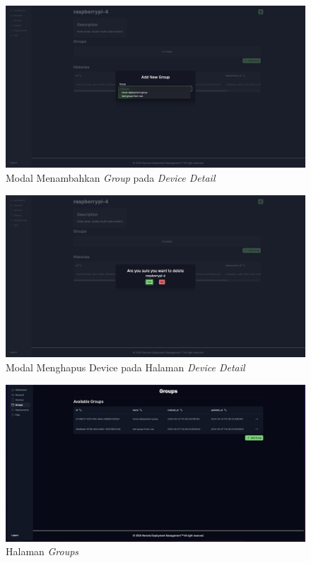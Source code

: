 \begin{figure}[h]
  \centering
  \includegraphics[width=1\textwidth]{resources/chapter-4/dashboard/device-detail-add-group.jpg}
  \caption{Modal Menambahkan \textit{Group} pada \textit{Device Detail}}
  \label{fig:halaman-device-detail-add-group}
\end{figure}

\begin{figure}[h]
  \centering
  \includegraphics[width=1\textwidth]{resources/chapter-4/dashboard/device-detail-delete.jpg}
  \caption{Modal Menghapus Device pada Halaman \textit{Device Detail}}
  \label{fig:halaman-device-detail-delete}
\end{figure}

\begin{figure}[h]
  \centering
  \includegraphics[width=1\textwidth]{resources/chapter-4/dashboard/groups-page.jpg}
  \caption{Halaman \textit{Groups}}
  \label{fig:halaman-groups}
\end{figure}

